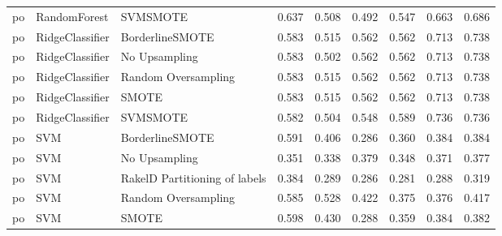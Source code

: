 \begin{tabular}{lllllllll}
      po &                    RandomForest &                      SVMSMOTE & 0.637 &                     0.508 &                 0.492 &                  0.547 &                                   0.663 &     0.686 \\
      po &                 RidgeClassifier &               BorderlineSMOTE & 0.583 &                     0.515 &                 0.562 &                  0.562 &                                   0.713 &     0.738 \\
      po &                 RidgeClassifier &                 No Upsampling & 0.583 &                     0.502 &                 0.562 &                  0.562 &                                   0.713 &     0.738 \\
      po &                 RidgeClassifier &           Random Oversampling & 0.583 &                     0.515 &                 0.562 &                  0.562 &                                   0.713 &     0.738 \\
      po &                 RidgeClassifier &                         SMOTE & 0.583 &                     0.515 &                 0.562 &                  0.562 &                                   0.713 &     0.738 \\
      po &                 RidgeClassifier &                      SVMSMOTE & 0.582 &                     0.504 &                 0.548 &                  0.589 &                                   0.736 &     0.736 \\
      po &                             SVM &               BorderlineSMOTE & 0.591 &                     0.406 &                 0.286 &                  0.360 &                                   0.384 &     0.384 \\
      po &                             SVM &                 No Upsampling & 0.351 &                     0.338 &                 0.379 &                  0.348 &                                   0.371 &     0.377 \\
      po &                             SVM & RakelD Partitioning of labels & 0.384 &                     0.289 &                 0.286 &                  0.281 &                                   0.288 &     0.319 \\
      po &                             SVM &           Random Oversampling & 0.585 &                     0.528 &                 0.422 &                  0.375 &                                   0.376 &     0.417 \\
      po &                             SVM &                         SMOTE & 0.598 &                     0.430 &                 0.288 &                  0.359 &                                   0.384 &     0.382 \\

\end{tabular}
